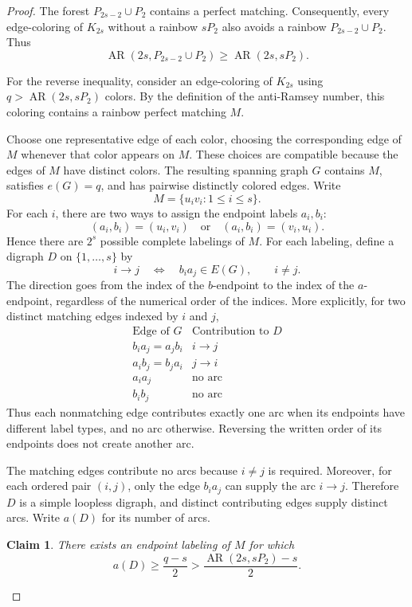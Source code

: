 \documentclass[12pt]{article}
\newtheorem{claim}[theorem]{Claim}
\DeclareMathOperator{\AR}{AR}
\begin{document}
\begin{proof}
	The forest $P_{2s-2}\cup P_2$ contains a perfect matching.
	Consequently, every edge-coloring of $K_{2s}$ without
	a rainbow $sP_2$ also avoids a rainbow $P_{2s-2}\cup P_2$.
	Thus
	\[
	\AR(2s,P_{2s-2}\cup P_2)\ge\AR(2s,sP_2).
	\]
	
	For the reverse inequality, consider an edge-coloring
	of $K_{2s}$ using $q>\AR(2s,sP_2)$ colors.
	By the definition of the anti-Ramsey number, this coloring
	contains a rainbow perfect matching $M$.
	
	Choose one representative edge of each color, choosing
	the corresponding edge of $M$ whenever that color appears
	on $M$. These choices are compatible because the edges
	of $M$ have distinct colors. The resulting spanning
	graph $G$ contains $M$, satisfies $e(G)=q$, and has
	pairwise distinctly colored edges.	
	Write
	\[
	M=\{u_i v_i:1\le i\le s\}.
	\]
	For each $i$, there are two ways to assign the endpoint
	labels $a_i,b_i$:
	\[
	(a_i,b_i)=(u_i,v_i)
	\quad\text{or}\quad
	(a_i,b_i)=(v_i,u_i).
	\]
	Hence there are $2^s$ possible complete labelings of $M$.
	For each labeling, define a digraph $D$ on $\{1,\ldots,s\}$ by
	\[
	i\to j
	\quad\Longleftrightarrow\quad
	b_i a_j\in E(G),
	\qquad i\ne j.
	\]
	The direction goes from the index of the $b$-endpoint
	to the index of the $a$-endpoint, regardless of the
	numerical order of the indices. More explicitly,
	for two distinct matching edges indexed by $i$ and $j$,
	\[
	\begin{array}{c|c}
		\text{Edge of }G & \text{Contribution to }D\\ \hline
		b_i a_j=a_j b_i & i\to j\\
		a_i b_j=b_j a_i & j\to i\\
		a_i a_j & \text{no arc}\\
		b_i b_j & \text{no arc}
	\end{array}
	\]
	Thus each nonmatching edge contributes exactly one arc
	when its endpoints have different label types, and
	no arc otherwise. Reversing the written order of its
	endpoints does not create another arc.
	
	The matching edges contribute no arcs because $i\ne j$
	is required. Moreover, for each ordered pair $(i,j)$,
	only the edge $b_i a_j$ can supply the arc $i\to j$.
	Therefore $D$ is a simple loopless digraph, and distinct
	contributing edges supply distinct arcs.
	Write $a(D)$ for its number of arcs.
	
	\begin{claim}\label{cl:max-labeling}
		There exists an endpoint labeling of $M$ for which
		\[
		a(D)\ge\frac{q-s}{2}
		>\frac{\AR(2s,sP_2)-s}{2}.
		\]
	\end{claim}
	

\end{proof}
\end{document}
